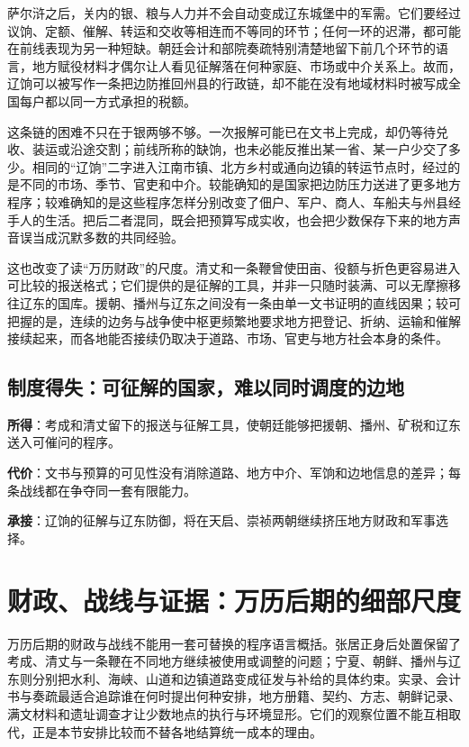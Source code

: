 萨尔浒之后，关内的银、粮与人力并不会自动变成辽东城堡中的军需。它们要经过议饷、定额、催解、转运和交收等相连而不等同的环节；任何一环的迟滞，都可能在前线表现为另一种短缺。朝廷会计和部院奏疏特别清楚地留下前几个环节的语言，地方赋役材料才偶尔让人看见征解落在何种家庭、市场或中介关系上。故而，辽饷可以被写作一条把边防推回州县的行政链，却不能在没有地域材料时被写成全国每户都以同一方式承担的税额。

这条链的困难不只在于银两够不够。一次报解可能已在文书上完成，却仍等待兑收、装运或沿途交割；前线所称的缺饷，也未必能反推出某一省、某一户少交了多少。相同的“辽饷”二字进入江南市镇、北方乡村或通向边镇的转运节点时，经过的是不同的市场、季节、官吏和中介。较能确知的是国家把边防压力送进了更多地方程序；较难确知的是这些程序怎样分别改变了佃户、军户、商人、车船夫与州县经手人的生活。把后二者混同，既会把预算写成实收，也会把少数保存下来的地方声音误当成沉默多数的共同经验。

这也改变了读“万历财政”的尺度。清丈和一条鞭曾使田亩、役额与折色更容易进入可比较的报送格式；它们提供的是征解的工具，并非一只随时装满、可以无摩擦移往辽东的国库。援朝、播州与辽东之间没有一条由单一文书证明的直线因果；较可把握的是，连续的边务与战争使中枢更频繁地要求地方把登记、折纳、运输和催解接续起来，而各地能否接续仍取决于道路、市场、官吏与地方社会本身的条件。

\subsection{制度得失：可征解的国家，难以同时调度的边地}
\textbf{所得}：考成和清丈留下的报送与征解工具，使朝廷能够把援朝、播州、矿税和辽东送入可催问的程序。

\textbf{代价}：文书与预算的可见性没有消除道路、地方中介、军饷和边地信息的差异；每条战线都在争夺同一套有限能力。

\textbf{承接}：辽饷的征解与辽东防御，将在天启、崇祯两朝继续挤压地方财政和军事选择。

\section{财政、战线与证据：万历后期的细部尺度}

万历后期的财政与战线不能用一套可替换的程序语言概括。张居正身后处置保留了考成、清丈与一条鞭在不同地方继续被使用或调整的问题；宁夏、朝鲜、播州与辽东则分别把水利、海峡、山道和边镇道路变成征发与补给的具体约束。实录、会计书与奏疏最适合追踪谁在何时提出何种安排，地方册籍、契约、方志、朝鲜记录、满文材料和遗址调查才让少数地点的执行与环境显形。它们的观察位置不能互相取代，正是本节安排比较而不替各地结算统一成本的理由。

